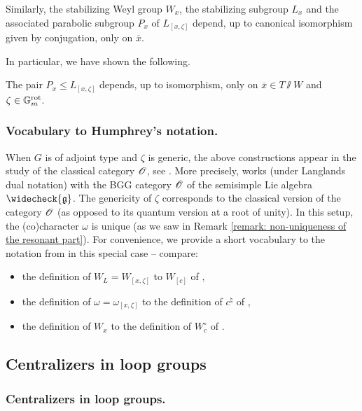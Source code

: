 Similarly, the stabilizing Weyl group $W_x$, the stabilizing subgroup $L_x$ and the associated parabolic subgroup $P_x$ of $L_{[x, \zeta]}$ depend, up to canonical isomorphism given by conjugation, only on $\overline{x}$.

In particular, we have shown the following.
\begin{claim}
The pair $P_x \leq L_{[x, \zeta]}$ depends, up to isomorphism, only on $\overline{x} \in T \sslash W$ and $\zeta \in \mathbb{G}_m^{\mathrm{rot}}$.   
\end{claim}




\subsubsection{Vocabulary to Humphrey's notation.}
When $G$ is of adjoint type and $\zeta$ is generic, the above constructions appear in the study of the classical category $\operatorname{\mathscr{O}}$, see \cite{Hum08, Jan79}. More precisely, \cite{Hum08} works (under Langlands dual notation) with the BGG category $\operatorname{\mathscr{O}}$ of the semisimple Lie algebra $\widecheck{\g}$. The genericity of $\zeta$ corresponds to the classical version of the category $\operatorname{\mathscr{O}}$ (as opposed to its quantum version at a root of unity). In this setup, the (co)character $\omega$ is unique (as we saw in Remark \ref{remark: non-uniqueness of the resonant part}). For convenience, we provide a short vocabulary to the notation from \cite{Hum08} in this special case -- compare:
    \begin{itemize}
        \item  the definition of $W_L = W_{[x, \zeta]}$ to $W_{[c]}$ of \cite[\S 3.4]{Hum08},
        \item the definition of $\omega = \omega_{[x, \zeta]}$ to the definition of $c^{\natural}$ of \cite[\S 7.4]{Hum08},
        \item the definition of $W_x$ to the definition of $W^{\circ}_c$ of \cite[\S 7.4]{Hum08}.
    \end{itemize}






\subsection{Centralizers in loop groups}\label{subsection: centralizers in loop groups}


\subsubsection{Centralizers in loop groups.}\label{section: centralizers}

